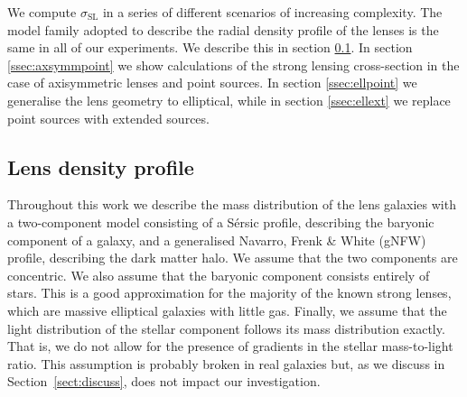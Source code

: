 \documentclass{aa}
\def\crosssect{\sigma_\mathrm{{SL}}}
\def\Sref#1{Section~\ref{#1}\xspace}
\begin{document}
We compute $\crosssect$ in a series of different scenarios of increasing complexity.
The model family adopted to describe the radial density profile of the lenses is the same in all of our experiments. We describe this in section \ref{ssec:profile}. %
In section \ref{ssec:axsymmpoint} we show calculations of the strong lensing cross-section in the case of axisymmetric lenses and point sources.
In section \ref{ssec:ellpoint} we generalise the lens geometry to elliptical, while in section \ref{ssec:ellext} we replace point sources with extended sources.



\subsection{Lens density profile}\label{ssec:profile}

Throughout this work we describe the mass distribution of the lens galaxies with a two-component model consisting of a S\'{e}rsic profile, describing the baryonic component of a galaxy, and a generalised Navarro, Frenk \& White (gNFW) profile, describing the dark matter halo.
We assume that the two components are concentric.
We also assume that the baryonic component consists entirely of stars.
This is a good approximation for the majority of the known strong lenses, which are massive elliptical galaxies with little gas.
Finally, we assume that the light distribution of the stellar component follows its mass distribution exactly. That is, we do not allow for the presence of gradients in the stellar mass-to-light ratio. This assumption is probably broken in real galaxies but, as we discuss in \Sref{sect:discuss}, does not impact our investigation.
\end{document}
